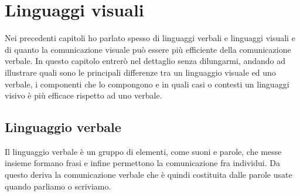 \chapter{Linguaggi visuali}

    Nei precedenti capitoli ho parlato spesso di linguaggi verbali e linguaggi visuali e di quanto la comunicazione visuale può essere più efficiente della comunicazione verbale. In questo capitolo entrerò nel dettaglio senza dilungarmi, andando ad illustrare quali sono le principali differenze tra un linguaggio visuale ed uno verbale, i componenti che lo compongono e in quali casi o contesti un linguaggi visivo è più efficace rispetto ad uno verbale.

    \section{Linguaggio verbale}
        Il linguaggio verbale è un gruppo di elementi, come suoni e parole, che messe insieme formano frasi e infine permettono la comunicazione fra individui. Da questo deriva la comunicazione verbale che è quindi costituita dalle parole usate quando parliamo o scriviamo.


